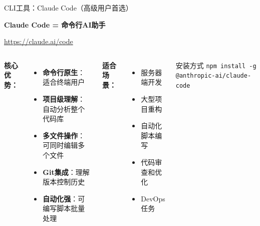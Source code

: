 \begin{frame}{CLI工具：Claude Code（高级用户首选）}
	\begin{center}
		\Huge \textbf{Claude Code = 命令行AI助手}

		\vspace{0.5cm}

		\normalsize
		\textcolor{blue}{\url{https://claude.ai/code}}
	\end{center}

	\vspace{0.3cm}

	\begin{columns}
		\textbf{核心优势：}
		\begin{itemize}
			\item \textbf{命令行原生}：适合终端用户
			\item \textbf{项目级理解}：自动分析整个代码库
			\item \textbf{多文件操作}：可同时编辑多个文件
			\item \textbf{Git集成}：理解版本控制历史
			\item \textbf{自动化强}：可编写脚本批量处理
		\end{itemize}

		\textbf{适合场景：}
		\begin{itemize}
			\item 服务器端开发
			\item 大型项目重构
			\item 自动化脚本编写
			\item 代码审查和优化
			\item DevOps任务
		\end{itemize}

		\vspace{0.3cm}

		\begin{alertblock}{安装方式}
			\texttt{npm install -g @anthropic-ai/claude-code}
		\end{alertblock}
	\end{columns}
\end{frame}


